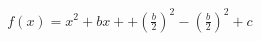 \documentclass[preview]{standalone}
\begin{document}
\begin{align*}
f(x) = x^2 + bx +   + \left(\frac{b}{2}\right)^2 - \left(\frac{b}{2}\right)^2  + c
\end{align*}
\end{document}
